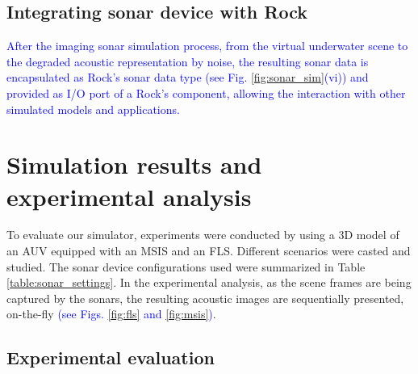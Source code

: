 \documentclass[final,5p,times]{elsarticle}
\begin{document}
\subsection{Integrating sonar device with Rock}
\label{dev:rock}

\textcolor{blue}{After the imaging sonar simulation process, from the virtual underwater scene to the degraded acoustic representation by noise, the resulting sonar data is encapsulated as Rock's sonar data type (see Fig. \ref{fig:sonar_sim}(vi)) and provided as I/O port of a Rock's component, allowing the interaction with other simulated models and applications.}


\section{Simulation results and experimental analysis}
\label{results}

To evaluate our simulator, experiments were conducted by using a 3D model
of an AUV equipped with an MSIS and an FLS. Different scenarios were casted and studied. The sonar device configurations used were summarized in
Table \ref{table:sonar_settings}. In the experimental analysis, as the scene frames are being captured by
the sonars, the resulting acoustic images are sequentially presented,
on-the-fly \textcolor{blue}{(see Figs. \ref{fig:fls} and \ref{fig:msis})}.

\subsection{Experimental evaluation}
\end{document}
